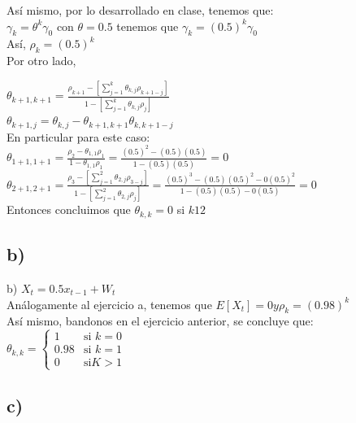 \documentclass{article}
\begin{document}
Así mismo, por lo desarrollado en clase, tenemos que:\\

$\gamma_k = \theta^k \gamma_0$   con  $\theta=0.5$  tenemos que  $\gamma_k = (0.5)^k \gamma_0 $\\

As{í}, $\rho_k = (0.5)^k $\\

Por otro lado,

$\theta_{k+1,k+1} = \frac{\rho_{k+1}-[\sum_{j=1}^{k} \theta_{k,j}\rho_{k+1-j} ]}{1- [\sum_{j=1}^{k} \theta_{k,j}\rho_{j} ]}$\\

$\theta_{k+1,j} =\theta_{k,j}-\theta_{k+1,k+1}\theta_{k,k+1-j} $\\

En particular para este caso: \\

$\theta_{1+1,1+1} = \frac{\rho_{2}-\theta_{1,1}\rho_{1} }{1-\theta_{1,1}\rho_{1}} = \frac{(0.5)^2 -(0.5)(0.5)}{1-(0.5)(0.5)} =0 $\\

$\theta_{2+1,2+1} = \frac{\rho_{3}-[\sum_{j=1}^{2} \theta_{2,j}\rho_{3-j} ]}{1- [\sum_{j=1}^{2} \theta_{2,j}\rho_{j}]} = \frac{(0.5)^3 -(0.5)(0.5)^2 - 0(0.5)^2}{1-(0.5)(0.5)-0(0.5)} = 0 $  \\

Entonces concluimos que $\theta_{k,k} = 0$ si $k12$

\subsection{b)}

b) 
$X_t = 0.5 x_{t-1} + W_t$ \\

Análogamente al ejercicio a, tenemos que $E[X_t]=0  y \rho_k = (0.98)^k$ \\

Así mismo, bandonos en el ejercicio anterior, se concluye que: \\

$\theta_{k,k} = \left\{\begin{array}{rl}  1 & \text{si } k =0 \\   0.98 & \text{si } k =1 \\  0 & \text{si}  K>1 \end{array} \right. $\\

\subsection{c)}
\end{document}
